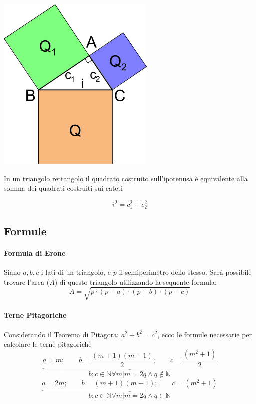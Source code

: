 \documentclass[12pt, a4paper,oneside]{report}
\begin{document}
	\includegraphics{Pit.jpg}
	\begin{pitagora}
	In un triangolo rettangolo il quadrato costruito sull'ipotenusa è equivalente alla somma dei quadrati costruiti sui cateti
	\end{pitagora}
	\[
	i^2=c^2_1+c^2_2
	\]
	\newpage
	\subsection{Formule}
	\vspace{1cm}
	\paragraph{Formula di Erone}
	Siano $a, b, c$ i lati di un triangolo, e $p$ il semiperimetro dello stesso. Sarà possibile trovare l'area ($A$) di questo triangolo utilizzando la sequente formula:
	\[
	A=\sqrt{p\cdot(p-a)\cdot(p-b)\cdot(p-c)}
	\]
	\vspace{1mm}
	\paragraph{Terne Pitagoriche}
	Considerando il Teorema di Pitagora: $a^2+b^2=c^2$, ecco le formule necessarie per calcolare le terne pitagoriche
	\[
	\underbrace{a=m;\qquad b= \frac{(m+1)(m-1)}{2};\qquad c=\frac{(m^2+1)}{2}}
	\]
	\[
	b; c\in\mathbb{N}\forall m|m=2q \land q \notin\mathbb{N}
	\]
	\vspace{3mm}
	\[
	\underbrace{a=2m;\qquad b=(m+1)(m-1);\qquad c=(m^2+1)}
	\]
	\[
	b; c\in\mathbb{N}\forall m|m=2q \land q \in\mathbb{N}
	\]
\end{document}
